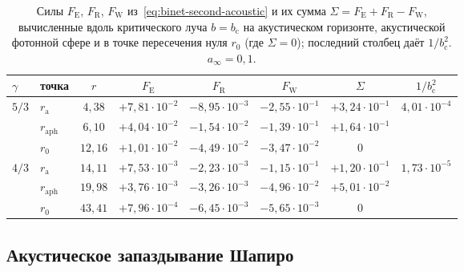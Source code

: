\documentclass[12pt,a4paper,preprint]{elsarticle}
\begin{document}
            \begin{table}[htb]
                \centering
                \caption{Силы $F_{\mathrm{E}}$, $F_{\mathrm{R}}$, $F_{\mathrm{W}}$ из~\eqref{eq:binet-second-acoustic} и их сумма $\Sigma=F_{\mathrm{E}}+F_{\mathrm{R}}-F_{\mathrm{W}}$, вычисленные вдоль критического луча $b=b_{\mathrm{c}}$ на акустическом горизонте, акустической фотонной сфере и в точке пересечения нуля $r_{0}$ (где $\Sigma=0$); последний столбец даёт $1/b_{\mathrm{c}}^{2}$. $a_{\infty}=0{,}1$.}
                \label{tab:phonon-forces}
                {\small
                \setlength{\tabcolsep}{4.5pt}
                \begin{tabular}{llcccccc}
                    \toprule
                    $\gamma$ & точка & $r$ & $F_{\mathrm{E}}$ & $F_{\mathrm{R}}$ & $F_{\mathrm{W}}$ & $\Sigma$ & $1/b^{2}_{\mathrm{c}}$ \\
                    \midrule
                    \multirow{3}{*}{$5/3$}
                    & $r_{\mathrm{a}}$   & $4{,}38$  & $+7{,}81\cdot 10^{-2}$ & $-8{,}95\cdot 10^{-3}$ & $-2{,}55\cdot 10^{-1}$ & $+3{,}24\cdot 10^{-1}$ & \multirow{3}{*}{$4{,}01\cdot 10^{-4}$} \\
                    & $r_{\mathrm{aph}}$ & $6{,}10$  & $+4{,}04\cdot 10^{-2}$ & $-1{,}54\cdot 10^{-2}$ & $-1{,}39\cdot 10^{-1}$ & $+1{,}64\cdot 10^{-1}$ & \\
                    & $r_{0}$          & $12{,}16$ & $+1{,}01\cdot 10^{-2}$ & $-4{,}49\cdot 10^{-2}$ & $-3{,}47\cdot 10^{-2}$ & $0$ & \\
                    \midrule
                    \multirow{3}{*}{$4/3$}
                    & $r_{\mathrm{a}}$   & $14{,}11$ & $+7{,}53\cdot 10^{-3}$ & $-2{,}23\cdot 10^{-3}$ & $-1{,}15\cdot 10^{-1}$ & $+1{,}20\cdot 10^{-1}$ & \multirow{3}{*}{$1{,}73\cdot 10^{-5}$} \\
                    & $r_{\mathrm{aph}}$ & $19{,}98$ & $+3{,}76\cdot 10^{-3}$ & $-3{,}26\cdot 10^{-3}$ & $-4{,}96\cdot 10^{-2}$ & $+5{,}01\cdot 10^{-2}$ & \\
                    & $r_{0}$          & $43{,}41$ & $+7{,}96\cdot 10^{-4}$ & $-6{,}45\cdot 10^{-3}$ & $-5{,}65\cdot 10^{-3}$ & $0$ & \\
                    \bottomrule
                \end{tabular}
                }
            \end{table}

        \subsection{Акустическое запаздывание Шапиро}\label{subsec:shapiro-delay}
\end{document}
